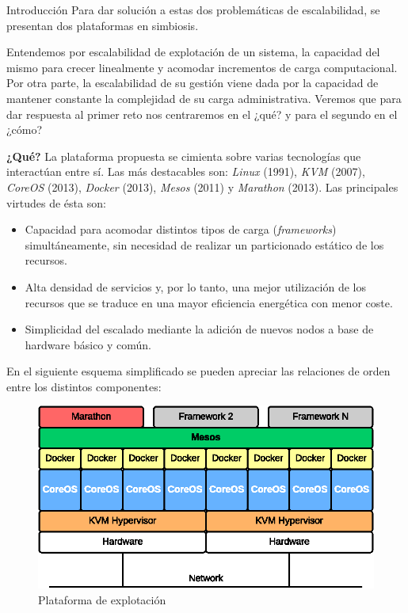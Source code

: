 \documentclass[a4paper,12pt,spanish,final]{epsc_tfc_pfc}
\begin{document}
\begin{intro}{Introducción}
Para dar solución a estas dos problemáticas de escalabilidad, se presentan dos plataformas en simbiosis.

Entendemos por escalabilidad de explotación de un sistema, la capacidad del mismo para crecer linealmente y acomodar incrementos de carga computacional. Por otra parte, la escalabilidad de su gestión viene dada por la capacidad de mantener constante la complejidad de su carga administrativa. Veremos que para dar respuesta al primer reto nos centraremos en el ¿qué? y para el segundo en el ¿cómo?

\textbf{¿Qué?} La plataforma propuesta se cimienta sobre varias tecnologías que interactúan entre sí. Las más destacables son: \emph{Linux} (1991), \emph{KVM} (2007), \emph{CoreOS} (2013), \emph{Docker} (2013), \emph{Mesos} (2011) y \emph{Marathon} (2013). Las principales virtudes de ésta son:
\begin{itemize}
  \item Capacidad para acomodar distintos tipos de carga (\emph{frameworks}) simultáneamente, sin necesidad de realizar un particionado estático de los recursos.
  \item Alta densidad de servicios y, por lo tanto, una mejor utilización de los recursos que se traduce en una mayor eficiencia energética con menor coste.
  \item Simplicidad del escalado mediante la adición de nuevos nodos a base de hardware básico y común.
\end{itemize}

En el siguiente esquema simplificado se pueden apreciar las relaciones de orden entre los distintos componentes:\\

\begin{figure}[h]
  \centering
    \includegraphics[scale=1]{plataforma}
      \caption{Plataforma de explotación}
\end{figure}


\end{intro}
\end{document}
